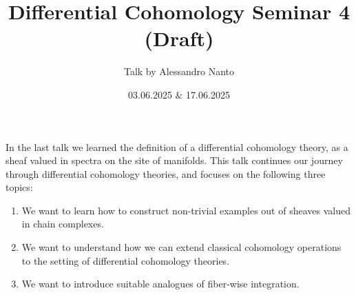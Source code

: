 \documentclass[10pt]{amsart}
\title{Differential Cohomology Seminar 4 (Draft)}
\date{03.06.2025 $\&$ 17.06.2025}
\author{Talk by Alessandro Nanto}
\theoremstyle{definition}
\theoremstyle{remark}
\begin{document}
\maketitle

In the last talk we learned the definition of a differential cohomology theory, as a sheaf valued in spectra on the site of manifolds. This talk continues our journey through differential cohomology theories, and focuses on the following three topics:
\begin{enumerate}
  \item We want to learn how to construct non-trivial examples out of sheaves valued in chain complexes.
  \item We want to understand how we can extend classical cohomology operations to the setting of differential cohomology theories.
  \item We want to introduce suitable analogues of fiber-wise integration.  
\end{enumerate}
\end{document}

